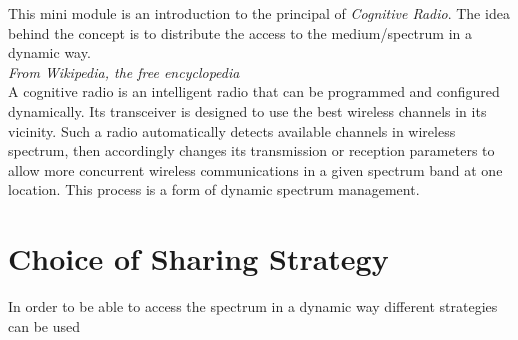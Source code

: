 This mini module is an introduction to the principal of \textit{Cognitive Radio}. The idea behind the concept is to distribute  the access to the medium/spectrum in a dynamic way. \\

\textit{From Wikipedia, the free encyclopedia}\\
A cognitive radio is an intelligent radio that can be programmed and configured dynamically. Its transceiver is designed to use the best wireless channels in its vicinity. Such a radio automatically detects available channels in wireless spectrum, then accordingly changes its transmission or reception parameters to allow more concurrent wireless communications in a given spectrum band at one location. This process is a form of dynamic spectrum management.

\section{Choice of Sharing Strategy}
In order to be able to access the spectrum in a dynamic way different strategies can be used  